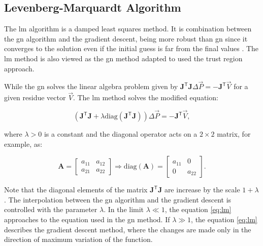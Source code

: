 \subsection{Levenberg-Marquardt Algorithm}

The \gls{lm} algorithm is a damped least squares method. It is combination between the \gls{gn} algorithm and the gradient descent, being more robust than \gls{gn} since it converges to the solution even if the initial guess is far from the final values \cite{numerical_recipes}. The \gls{lm} method is also viewed as the \gls{gn} method adapted to used the trust region approach.

While the \gls{gn} solves the linear algebra problem given by $\mathbf{J}^{\mathsf{T}}\mathbf{J}\Delta \vec{P} = - \mathbf{J}^{\mathsf{T}} \vec{V}$ for a given residue vector $\vec{V}$. The \gls{lm} method solves the modified equation:

\begin{equation}
    \left(\mathbf{J}^{\mathsf{T}}\mathbf{J} + \lambda \mathrm{diag}\left(\mathbf{J}^{\mathsf{T}}\mathbf{J}\right) \right)\Delta \vec{P} = - \mathbf{J}^{\mathsf{T}}\vec{V},
    \label{eq:lm}
\end{equation}

where $\lambda > 0$ is a constant and the diagonal operator acts on a $2\times 2$ matrix, for example, as:

\begin{equation}
        \mathbf{A} = \begin{bmatrix}
     a_{11} & a_{12} \\
     a_{21} & a_{22} 
\end{bmatrix} \Rightarrow \mathrm{diag}\left(\mathbf{A}\right) = \begin{bmatrix}
     a_{11} & 0 \\
     0 & a_{22}
 \end{bmatrix}.
\end{equation}

Note that the diagonal elements of the matrix $\mathbf{J}^{\mathsf{T}}\mathbf{J}$ are increase by the scale $1 + \lambda$. The interpolation between the \gls{gn} algorithm and the gradient descent is controlled with the parameter $\lambda$. In the limit $\lambda \ll 1$, the equation \eqref{eq:lm} approaches to the equation used in the \gls{gn} method. If $\lambda \gg 1$, the equation \eqref{eq:lm} describes the gradient descent method, where the changes are made only in the direction of maximum variation of the function.

